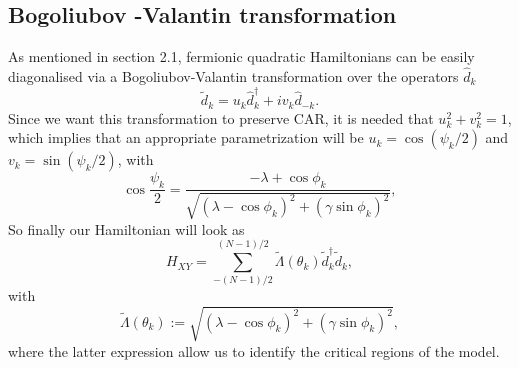 \subsection{Bogoliubov -Valantin transformation}
As mentioned in section 2.1, fermionic quadratic Hamiltonians can be easily diagonalised via a Bogoliubov-Valantin transformation over the operators $\hat{d}_k$
\begin{equation}
\tilde{d}_{k}=u_{k} \hat{d}_{k}^{\dagger}+i v_{k} \hat{d}_{-k}.
\end{equation}
Since we want this transformation to preserve CAR, it is needed that $u_k^2 + v_k^2 = 1$, which implies that an appropriate parametrization will be $u_{k}=\cos \left(\psi_{k} / 2\right)$ and $v_{k}=\sin \left(\psi_{k} / 2\right)$, with
\begin{equation}
\cos \frac{\psi_{k}}{2}=\frac{-\lambda+\cos \phi_{k}}{\sqrt{\left(\lambda-\cos \phi_{k}\right)^{2}+\left(\gamma \sin \phi_{k}\right)^{2}}},
\end{equation}
So finally our Hamiltonian will look as
\begin{equation}
H_{X Y}=\sum_{-(N-1) / 2}^{(N-1) / 2} \tilde{\Lambda}(\theta_{k}) \tilde{d}_{k}^{\dagger} \tilde{d}_{k},
\end{equation}
with 
\begin{equation}
\tilde{\Lambda}(\theta_{k}):=\sqrt{\left(\lambda-\cos \phi_{k}\right)^{2}+\left(\gamma \sin \phi_{k}\right)^{2}},
\label{CH3:Spectrum_XY_model}
\end{equation}
where the latter expression allow us to identify the critical regions of the model.
